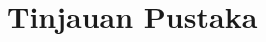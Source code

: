 \documentclass[../projects/thesis.tex]{subfiles}
\begin{document}
\chapter{Tinjauan Pustaka}\label{chap:pstk}



\end{document}
